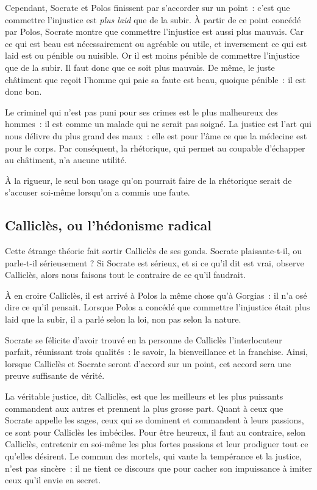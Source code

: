 \documentclass[a5paper,12pt]{article}
\begin{document}
Cependant, Socrate et Polos finissent par s'accorder sur un point~: c'est que commettre l'injustice est \emph{plus laid} que de la subir. À partir de ce point concédé par Polos, Socrate montre que commettre l'injustice est aussi plus mauvais. Car ce qui est beau est nécessairement ou agréable ou utile, et inversement ce qui est laid est ou pénible ou nuisible. Or il est moins pénible de commettre l'injustice que de la subir. Il faut donc que ce soit plus mauvais. De même, le juste châtiment que reçoit l'homme qui paie sa faute est beau, quoique pénible~: il est donc bon.

Le criminel qui n'est pas puni pour ses crimes est le plus malheureux des hommes~: il est comme un malade qui ne serait pas soigné. La justice est l'art qui nous délivre du plus grand des maux~: elle est pour l'âme ce que la médecine est pour le corps. Par conséquent, la rhétorique, qui permet au coupable d'échapper au châtiment, n'a aucune utilité.

À la rigueur, le seul bon usage qu'on pourrait faire de la rhétorique serait de s'accuser soi-même lorsqu'on a commis une faute.

\subsection*{Calliclès, ou l'hédonisme radical}

Cette étrange théorie fait sortir Calliclès de ses gonds. Socrate plaisante-t-il, ou parle-t-il sérieusement ? Si Socrate est sérieux, et si ce qu'il dit est vrai, observe Calliclès, alors nous faisons tout le contraire de ce qu'il faudrait.

À en croire Calliclès, il est arrivé à Polos la même chose qu'à Gorgias~: il n'a osé dire ce qu'il pensait. Lorsque Polos a concédé que commettre l'injustice était plus laid que la subir, il a parlé selon la loi, non pas selon la nature.

Socrate se félicite d'avoir trouvé en la personne de Calliclès l'interlocuteur parfait, réunissant trois qualités~: le savoir, la bienveillance et la franchise. Ainsi, lorsque Calliclès et Socrate seront d'accord sur un point, cet accord sera une preuve suffisante de vérité.

La véritable justice, dit Calliclès, est que les meilleurs et les plus puissants commandent aux autres et prennent la plus grosse part. Quant à ceux que Socrate appelle les sages, ceux qui se dominent et commandent à leurs passions, ce sont pour Calliclès les imbéciles. Pour être heureux, il faut au contraire, selon Calliclès, entretenir en soi-même les plus fortes passions et leur prodiguer tout ce qu'elles désirent. Le commun des mortels, qui vante la tempérance et la justice, n'est pas sincère~: il ne tient ce discours que pour cacher son impuissance à imiter ceux qu'il envie en secret.
\end{document}
